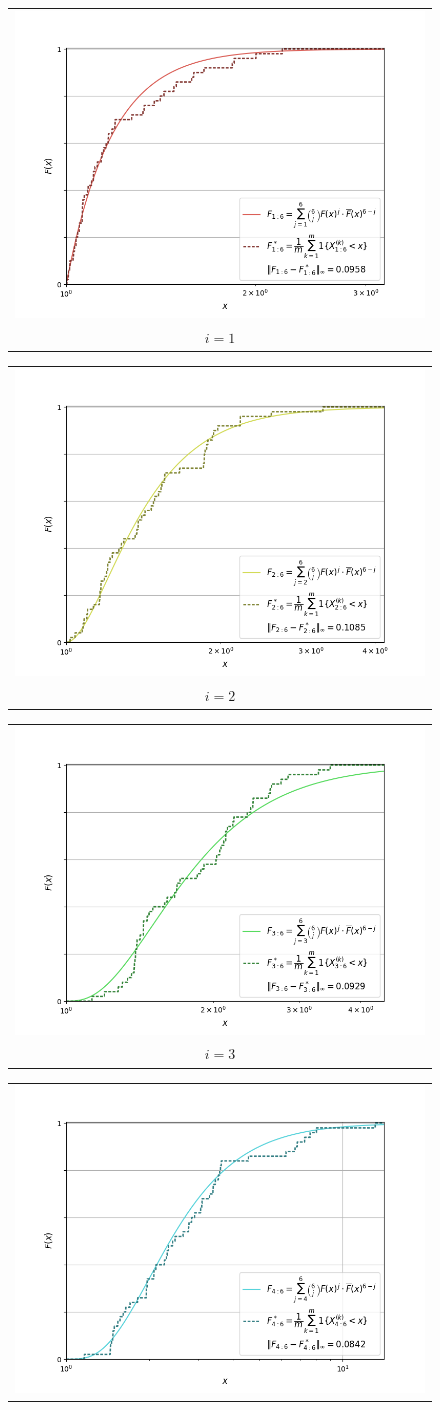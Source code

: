 \newpage

\begin{figure}[H]
    \centering
    \begin{tabular}{@{}c@{}}
        \includegraphics[trim={1.1cm 0.5cm 1.5cm 0cm}, clip,width=.46\linewidth]{../simulation/pareto_order_1:6.png} \\
        $i = 1$
      \end{tabular}
    \begin{tabular}{@{}c@{}}
        \includegraphics[trim={1.1cm 0.5cm 1.5cm 0cm}, clip,width=.46\linewidth]{../simulation/pareto_order_2:6.png} \\
        $i = 2$
    \end{tabular}
    \begin{tabular}{@{}c@{}}
        \includegraphics[trim={1.1cm 0.5cm 1.5cm 0cm}, clip,width=.46\linewidth]{../simulation/pareto_order_3:6.png} \\
        $i = 3$
      \end{tabular}
    \begin{tabular}{@{}c@{}}
        \includegraphics[trim={1.1cm 0.5cm 1.5cm 0cm}, clip,width=.46\linewidth]{../simulation/pareto_order_4:6.png} \\

\end{tabular}
\end{figure}
